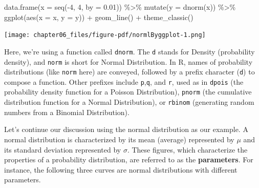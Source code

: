 \documentclass[
  a4paper,
]{book}
\newenvironment{Shaded}{\begin{snugshade}}{\end{snugshade}}
\newcommand{\AttributeTok}[1]{\textcolor[rgb]{0.40,0.45,0.13}{#1}}
\newcommand{\DecValTok}[1]{\textcolor[rgb]{0.68,0.00,0.00}{#1}}
\newcommand{\FloatTok}[1]{\textcolor[rgb]{0.68,0.00,0.00}{#1}}
\newcommand{\FunctionTok}[1]{\textcolor[rgb]{0.28,0.35,0.67}{#1}}
\newcommand{\NormalTok}[1]{\textcolor[rgb]{0.00,0.23,0.31}{#1}}
\newcommand{\SpecialCharTok}[1]{\textcolor[rgb]{0.37,0.37,0.37}{#1}}
\begin{document}
\begin{Shaded}
\begin{Highlighting}[]
\FunctionTok{data.frame}\NormalTok{(}\AttributeTok{x =} \FunctionTok{seq}\NormalTok{(}\SpecialCharTok{{-}}\DecValTok{4}\NormalTok{, }\DecValTok{4}\NormalTok{, }\AttributeTok{by =} \FloatTok{0.01}\NormalTok{)) }\SpecialCharTok{\%\textgreater{}\%}
  \FunctionTok{mutate}\NormalTok{(}\AttributeTok{y =} \FunctionTok{dnorm}\NormalTok{(x)) }\SpecialCharTok{\%\textgreater{}\%}
  \FunctionTok{ggplot}\NormalTok{(}\FunctionTok{aes}\NormalTok{(}\AttributeTok{x =}\NormalTok{ x, }\AttributeTok{y =}\NormalTok{ y)) }\SpecialCharTok{+}
  \FunctionTok{geom\_line}\NormalTok{() }\SpecialCharTok{+}
  \FunctionTok{theme\_classic}\NormalTok{()}
\end{Highlighting}
\end{Shaded}

\texttt{[image: chapter06\_files/figure-pdf/normlByggplot-1.png]}

Here, we're using a function called \texttt{dnorm}. The \texttt{d}
stands for Density (probability density), and \texttt{norm} is short for
Normal Distribution. In R, names of probability distributions (like
\texttt{norm} here) are conveyed, followed by a prefix character
(\texttt{d}) to compose a function. Other prefixes include
\texttt{p},\texttt{q}, and \texttt{r}, used as in \texttt{dpois} (the
probability density function for a Poisson Distribution), \texttt{pnorm}
(the cumulative distribution function for a Normal Distribution), or
\texttt{rbinom} (generating random numbers from a Binomial
Distribution).

Let's continue our discussion using the normal distribution as our
example. A normal distribution is characterized by its mean (average)
represented by \(\mu\) and its standard deviation represented by
\(\sigma\). These figures, which characterize the properties of a
probability distribution, are referred to as the \textbf{parameters}.
For instance, the following three curves are normal distributions with
different parameters.
\end{document}
